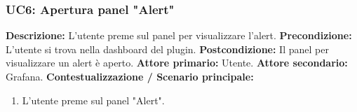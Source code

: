                 \subsubsection{UC6: Apertura panel "Alert"}
                    \textbf{Descrizione:} L’utente preme sul panel per visualizzare l'alert.
                    \newline
                    \textbf{Precondizione:} L'utente si trova nella dashboard del plugin.
                    \newline
                    \textbf{Postcondizione:} Il panel per visualizzare un alert è aperto.
                    \newline
                    \textbf{Attore primario:} Utente.
                    \newline
                    \textbf{Attore secondario:} Grafana.
                    \newline
                    \textbf{Contestualizzazione / Scenario principale:} \begin{enumerate}
                            \item L’utente preme sul panel "Alert".
                        \end{enumerate}   
                    
                        
                        
                     		

